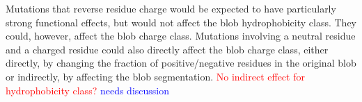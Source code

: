 \documentclass[10pt,letterpaper]{article}
\newcommand{\dSNPs}{dSNPs~}
\newcommand{\nSNPs}{nSNPs~}
\newcommand{\hydrochar}{hydrophobicity class}
\newcommand{\chargechar}{charge class}
\newcommand{\grace}[1]{\textcolor{red}{#1}}
\newcommand{\ruchi}[1]{\textcolor{blue}{#1}}
\begin{document}
Mutations that reverse residue charge would be expected to have particularly strong functional effects, but would not affect the blob \hydrochar{}. They could, however, affect the blob \chargechar{}. Mutations involving a neutral residue and a charged residue could also directly affect the blob \chargechar{},  either directly, by changing the fraction of positive/negative residues in the original blob or indirectly, by affecting the blob segmentation. \grace{No indirect effect for \hydrochar?} \ruchi{needs discussion}   %
\end{document}
